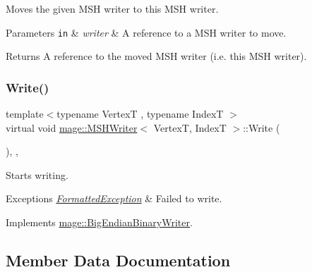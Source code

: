 Moves the given M\+SH writer to this M\+SH writer.


\begin{DoxyParams}[1]{Parameters}
\mbox{\tt in}  & {\em writer} & A reference to a M\+SH writer to move. \\
\hline
\end{DoxyParams}
\begin{DoxyReturn}{Returns}
A reference to the moved M\+SH writer (i.\+e. this M\+SH writer). 
\end{DoxyReturn}
\hypertarget{classmage_1_1_m_s_h_writer_ab97c9570c45bff97d88700d0dcf3ed75}{}\label{classmage_1_1_m_s_h_writer_ab97c9570c45bff97d88700d0dcf3ed75} 
\subsubsection{\texorpdfstring{Write()}{Write()}}
{\footnotesize\ttfamily template$<$typename VertexT , typename IndexT $>$ \\
virtual void \hyperlink{classmage_1_1_m_s_h_writer}{mage\+::\+M\+S\+H\+Writer}$<$ VertexT, IndexT $>$\+::Write (\begin{DoxyParamCaption}{ }\end{DoxyParamCaption})\hspace{0.3cm}{\ttfamily [override]}, {\ttfamily [private]}, {\ttfamily [virtual]}}

Starts writing.


\begin{DoxyExceptions}{Exceptions}
{\em \hyperlink{classmage_1_1_formatted_exception}{Formatted\+Exception}} & Failed to write. \\
\hline
\end{DoxyExceptions}


Implements \hyperlink{classmage_1_1_big_endian_binary_writer_ae6ee6613e629971502324cffc944795d}{mage\+::\+Big\+Endian\+Binary\+Writer}.



\subsection{Member Data Documentation}
\hypertarget{classmage_1_1_m_s_h_writer_a01cf9e635af683a1a9d6fa347b219dee}{}\label{classmage_1_1_m_s_h_writer_a01cf9e635af683a1a9d6fa347b219dee} 
